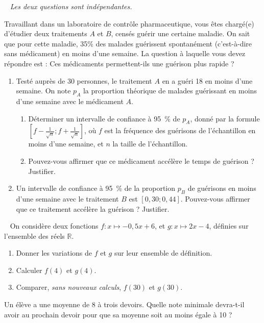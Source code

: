 \documentclass[12pt]{article}
\begin{document}
\begin{exercice}~
  \noindent\emph{Les deux questions sont indépendantes.}

  Travaillant dans un laboratoire de contrôle pharmaceutique, vous êtes chargé(e) d'étudier deux traitements $A$ et $B$, censés guérir une certaine maladie. On sait que pour cette maladie, 35\% des malades guérissent spontanément (c'est-à-dire sans médicament) en moins d'une semaine. La question à laquelle vous devez répondre est : Ces médicaments permettent-ils une guérison plus rapide ?

  \begin{enumerate}
    \item Testé auprès de 30 personnes, le traitement $A$ en a guéri 18 en moins d'une semaine. On note $p_A$ la proportion théorique de malades guérissant en moins d'une semaine avec le médicament $A$.
      \begin{enumerate}
        \item Déterminer un intervalle de confiance à 95~\% de $p_A$, donné par la formule $\left[f-\frac{1}{\sqrt{n}};f+\frac{1}{\sqrt{n}}\right]$, où $f$ est la fréquence des guérisons de l'échantillon en moins d'une semaine, et $n$ la taille de l'échantillon.
        \item Pouvez-vous affirmer que ce médicament accélère le temps de guérison ? Justifier.
      \end{enumerate}
    \item Un intervalle de confiance à 95~\% de la proportion $p_B$ de guérisons en moins d'une semaine avec le traitement $B$ est $\left[0,30;0,44\right]$. Pouvez-vous affirmer que ce traitement accélère la guérison ? Justifier.
  \end{enumerate}
\end{exercice}


\begin{exercice}~
  On considère deux fonctions $f:x\mapsto -0,5x+6$, et $g:x\mapsto 2x-4$,
  définies sur l'ensemble des réels $\mathbb{R}$.
  \begin{enumerate}
    \item Donner les variations de $f$ et $g$ sur leur ensemble de définition.
    \item Calculer $f(4)$ et $g(4)$.
    \item Comparer, \emph{sans nouveaux calculs}, $f(30)$ et $g(30)$.
  \end{enumerate}
\end{exercice}


\begin{exercice}
Un élève a une moyenne de 8 à trois devoirs. Quelle note minimale devra-t-il avoir au prochain devoir pour que sa moyenne soit au moins égale à 10 ?
\end{exercice}
\end{document}
